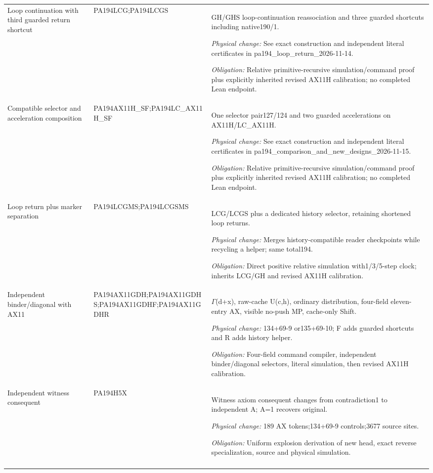 {\begin{longtable}{@{}>{\raggedright\arraybackslash}p{}>{\raggedright\arraybackslash}p{}>{\raggedright\arraybackslash}p{}@{}}
Loop continuation with third guarded return shortcut & PA194LCG;\allowbreak PA194LCGS & GH/GHS loop-continuation reassociation and three guarded shortcuts including native190/1.\par\emph{Physical change:} See exact construction and independent literal certificates in pa194\_loop\_return\_2026-11-14.\par\emph{Obligation:} Relative primitive-recursive simulation/command proof plus explicitly inherited revised AX11H calibration; no completed Lean endpoint.\\\addlinespace
Compatible selector and acceleration composition & PA194AX11H\_SF;\allowbreak PA194LC\_AX11H\_SF & One selector pair127/124 and two guarded accelerations on AX11H/LC\_AX11H.\par\emph{Physical change:} See exact construction and independent literal certificates in pa194\_comparison\_and\_new\_designs\_2026-11-15.\par\emph{Obligation:} Relative primitive-recursive simulation/command proof plus explicitly inherited revised AX11H calibration; no completed Lean endpoint.\\\addlinespace
Loop return plus marker separation & PA194LCGMS;\allowbreak PA194LCGSMS & LCG/LCGS plus a dedicated history selector, retaining shortened loop returns.\par\emph{Physical change:} Merges history-compatible reader checkpoints while recycling a helper; same total194.\par\emph{Obligation:} Direct positive relative simulation with1/3/5-step clock; inherits LCG/GH and revised AX11H calibration.\\\addlinespace
Independent binder/diagonal with AX11 & PA194AX11GDH;\allowbreak PA194AX11GDHS;\allowbreak PA194AX11GDHF;\allowbreak PA194AX11GDHR & \(\Gamma\)(d+x), raw-cache U(c,h), ordinary distribution, four-field eleven-entry AX, visible no-push MP, cache-only Shift.\par\emph{Physical change:} 134+69-9 or135+69-10; F adds guarded shortcuts and R adds history helper.\par\emph{Obligation:} Four-field command compiler, independent binder/diagonal selectors, literal simulation, then revised AX11H calibration.\\\addlinespace
Independent witness consequent & PA194H5X & Witness axiom consequent changes from contradiction1 to independent A; A=1 recovers original.\par\emph{Physical change:} 189 AX tokens;134+69-9 controls;3677 source sites.\par\emph{Obligation:} Uniform explosion derivation of new head, exact reverse specialization, source and physical simulation.\\\addlinespace

\end{longtable}}
